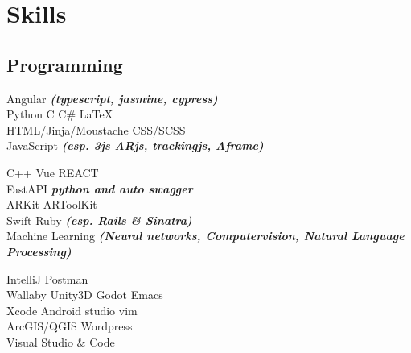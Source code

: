 \documentclass[a4paper]{deedy-resume_twopage} %
\begin{document}
\begin{minipage}[t]{0.33\textwidth}

  \sectionspace
  \section{Skills}

  \subsection{Programming}
  \textbullet{} Angular {\footnotesize \textit{\textbf{(typescript, jasmine, cypress)}}} \\
  \textbullet{} Python
  \textbullet{} C  \textbullet{} C\# \textbullet{} \LaTeX\ \\
  \textbullet{} HTML/Jinja/Moustache \textbullet{} CSS/SCSS \\
   \textbullet{} JavaScript {\footnotesize \textit{\textbf{(esp. 3js ARjs, trackingjs, Aframe)}}} \\

  \sectionspace

  \textbullet{} C++ \textbullet{} Vue \textbullet{} REACT \\
  \textbullet{} FastAPI {\footnotesize \textit{\textbf{python and auto swagger}}} \\
  \textbullet{} ARKit \textbullet{} ARToolKit \\
  \textbullet{} Swift \textbullet{}  Ruby {\footnotesize \textit{\textbf{(esp. Rails \& Sinatra)}}} \\
  \textbullet{} Machine Learning {\footnotesize \textit{\textbf{(Neural networks, Computervision, Natural Language Processing)}}}

  \sectionspace

  \textbullet{} IntelliJ \textbullet{} Postman \\
  \textbullet{} Wallaby
  \textbullet{} Unity3D \textbullet{} Godot \textbullet{} Emacs \\
  \textbullet{} Xcode \textbullet{} Android studio \textbullet{} vim \\
  \textbullet{} ArcGIS/QGIS \textbullet{} Wordpress \\
  \textbullet{} Visual Studio \& Code \\


\end{minipage}
\end{document}
